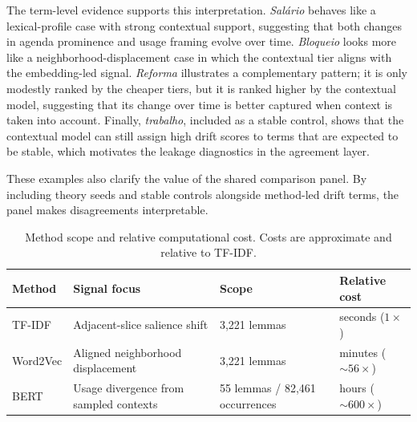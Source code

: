 \documentclass[12pt]{article}
\begin{document}
The term-level evidence supports this interpretation. \textit{Sal\'ario}
behaves like a lexical-profile case with strong contextual support, %
suggesting that both changes in agenda prominence and usage framing evolve over time.
\textit{Bloqueio} looks more like a neighborhood-displacement case in which the
contextual tier aligns with the embedding-led signal. \textit{Reforma}
illustrates a complementary pattern; %
it is only modestly ranked by
the cheaper tiers, but it is ranked higher by the contextual model, suggesting that its change over time is better captured when context is taken into account. Finally, \textit{trabalho}, included as a stable control, shows that the contextual model can still assign high drift scores to terms that are expected to be stable, which motivates the leakage diagnostics in the agreement layer.

These examples also clarify the value of the shared comparison panel. %
By including theory seeds and stable controls alongside method-led drift terms, the panel makes disagreements interpretable.

\begin{table}[!htb]
    \centering
    \footnotesize
    \caption{Method scope and relative computational cost. Costs are approximate and relative to TF-IDF.}
    \label{tab:method_profile}
    \setlength{\tabcolsep}{2.8pt} %
    \begin{tabular}{lp{5.8cm}ll}
        \toprule
        Method & Signal focus & Scope & Relative cost \\
        \midrule
        TF-IDF & Adjacent-slice salience shift & 3{,}221 lemmas & seconds ($1{\times}$) \\
        Word2Vec & Aligned neighborhood displacement & 3{,}221 lemmas & minutes (${\sim}56{\times}$) \\
        BERT & Usage divergence from sampled contexts & 55 lemmas / 82{,}461 occurrences & hours (${\sim}600{\times}$) \\
        \bottomrule
    \end{tabular}
\end{table}
\end{document}
